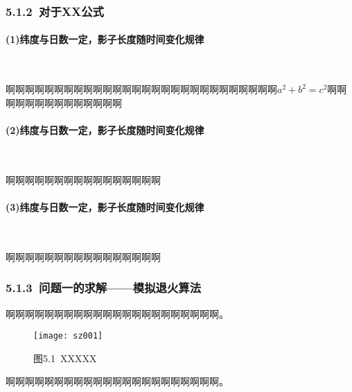 \documentclass[12pt,a4paper]{article}
\begin{document}
\subsubsection*{5.1.2\ 对于XX公式}

\paragraph*{\textbf{(1)纬度与日数一定，影子长度随时间变化规律}}\ \\\vspace{-1.0em}
\begin{spacing}{1.0}
	啊啊啊啊啊啊啊啊啊啊啊啊啊啊啊啊啊啊啊啊啊啊啊啊啊啊啊啊$a^{2}+b^{2}=c^{2}$啊啊啊啊啊啊啊啊啊啊啊啊啊啊
\end{spacing}\vspace{-1.0em}
\paragraph*{\textbf{(2)纬度与日数一定，影子长度随时间变化规律}}\ \\\vspace{-1.0em}
\begin{spacing}{1.0}
	啊啊啊啊啊啊啊啊啊啊啊啊啊啊啊啊
\end{spacing}\vspace{-1.0em}
\paragraph*{\textbf{(3)纬度与日数一定，影子长度随时间变化规律}}\ \\\vspace{-1.0em}
\begin{spacing}{1.0}
	啊啊啊啊啊啊啊啊啊啊啊啊啊啊啊啊
\end{spacing}\vspace{-1.0em}
\subsubsection*{5.1.3\ 问题一的求解——模拟退火算法}
\begin{spacing}{1.0}
	\sloppy{}
	啊啊啊啊啊啊啊啊啊啊啊啊啊啊啊啊啊啊啊啊啊啊。
\end{spacing}
\begin{figure}[htbp] %
	\centering\texttt{[image: sz001]} %
	\caption*{图5.1\ XXXXX}
\end{figure}
\begin{spacing}{1.0}
	\sloppy{}
	啊啊啊啊啊啊啊啊啊啊啊啊啊啊啊啊啊啊啊啊啊啊。
\end{spacing}
\end{document}
